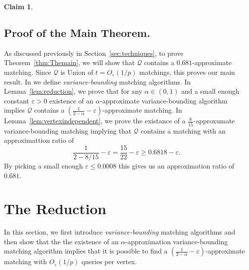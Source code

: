 \documentclass[letterpaper,11pt]{article}
\renewcommand{\epsilon}{\varepsilon}
\newcommand{\mc}[1]{\ensuremath{\mathcal{#1}}}
\newcommand{\apx}[0]{\ensuremath{\mathcal{\alpha}}}
\renewcommand{\epsilon}[0]{\ensuremath{\varepsilon}}
\newtheorem{claim}[lemma]{Claim}
\renewcommand{\mc}[1]{\ensuremath{\mathcal{#1}}}
\begin{document}
\begin{claim}
    \label{claim:lowerbound_einQ}
    \claimlowerboundeinQ{}
\end{claim}

\subsection{Proof of the Main Theorem.}  As discussed previously  in  Section~\ref{sec:techniques}, to prove  Theorem~\ref{thm:Themain}, we will show that $\mc{Q}$ contains a $0.681$-approximate matching. Since $\mc{Q}$ is Union of $t=O_\epsilon(1/p)$ matchings, this proves our main result. In  we define {\em variance-bounding} matching  algorithms. In Lemma~\ref{lem:reduction}, we prove that for any $\alpha\in (0,1)$ and a small enough constant $\epsilon>0$ existence of an $\alpha$-approximate variance-bounding algorithm implies $\mc{Q}$ contains a $(\frac{1}{2-\alpha}-\epsilon)$-approximate matching. In Lemma~\ref{lem:vertexindependent}, we prove the existance of a $\frac{8}{15}$-approxumate variance-bounding matching implying that $\mc{Q}$ contains a matching with an approximattion  ratio of 
$$\frac{1}{2-8/15}-\epsilon
=\frac{15}{22}-\epsilon \geq 0.6818-\epsilon.$$
By picking a small enough $\epsilon\leq 0.0008$ this gives us an approximation ratio of $0.681$. \section{The Reduction}
In this section, we first introduce {\em variance-bounding} matching algorithms and then show that the
the existence of an $\alpha$-approximation variance-bounding matching  algorithm  implies that it is possible to find  a $(\frac{1}{2-\apx}-\epsilon)$-approximate matching  with $O_\epsilon(1/p)$ queries per vertex. 
\end{document}
